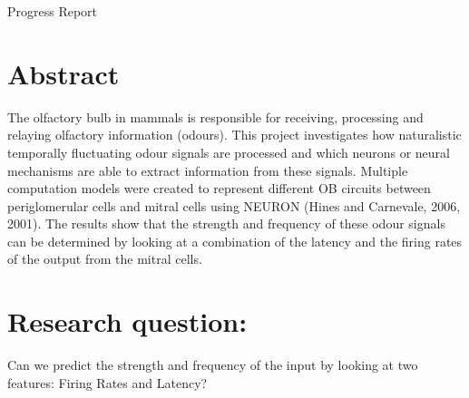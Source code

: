 \documentclass[11pt]{report}
\begin{document}
\begin{center}
{\Huge Progress Report}
\end{center}
\section*{Abstract}
The olfactory bulb in mammals is responsible for receiving, processing and relaying olfactory information (odours). This project investigates how naturalistic temporally fluctuating odour signals are processed and which neurons 
or neural mechanisms are able to extract information from these signals. Multiple computation models were created to represent different OB circuits between periglomerular cells and mitral cells using NEURON (Hines and Carnevale, 2006, 2001). 
The results show that the strength and frequency of these odour signals can be determined by looking at a combination of the latency and the firing rates of the output from the mitral cells. 

\section*{Research question:}
Can we predict the strength and frequency of the input by looking at two features: Firing Rates and Latency?\\
\end{document}
